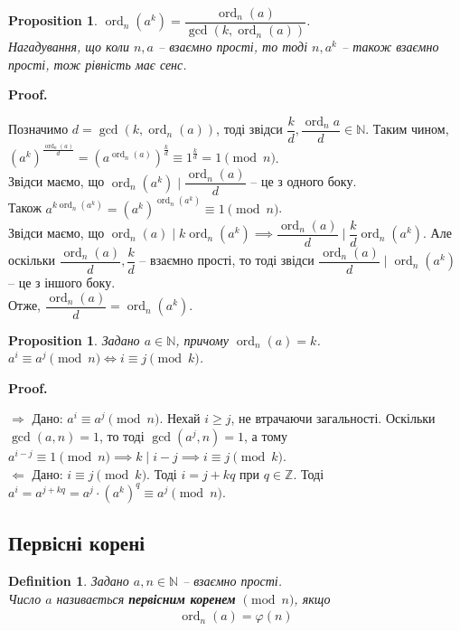 \documentclass[a4paper, 14pt]{extarticle}
\makeatletter
\theoremstyle{theoremdd}
\theoremstyle{theoremdd}
\newtheorem{definition}[theorem]{Definition}
\theoremstyle{theoremdd}
\theoremstyle{theoremdd}
\theoremstyle{theoremdd}
\newtheorem{proposition}[theorem]{Proposition}
\theoremstyle{theoremdd}
\theoremstyle{theoremdd}
\theoremstyle{theoremdd}
\def\qed{$\blacksquare$}
\def\rightproof{$\boxed{\Rightarrow}$ }
\def\leftproof{$\boxed{\Leftarrow}$ }
\renewenvironment{proof}[1][Proof.\\]{\par
\pushQED{\hfill \qed}%
\normalfont \topsep6\p@\@plus6\p@\relax
\trivlist
\item\relax
{\bfseries
#1\@addpunct{.}}\hspace\labelsep\ignorespaces
}{%
\popQED\endtrivlist\@endpefalse
}
\DeclareMathOperator{\ord}{ord}
\makeatother
\begin{document}
\begin{proposition}
$\ord_n (a^k) = \dfrac{\ord_n (a)}{\gcd(k,\ord_n (a))}$.\\
\textit{Нагадування, що коли $n,a$ -- взаємно прості, то тоді $n,a^k$ -- також взаємно прості, тож рівність має сенс.}
\end{proposition}

\begin{proof}
Позначимо $d = \gcd(k,\ord_n (a))$, тоді звідси $\dfrac{k}{d}, \dfrac{\ord_n a}{d} \in \mathbb{N}$. Таким чином,\\
$\left( a^k \right)^{\frac{\ord_n (a)}{d}} = \left( a^{\ord_n (a)} \right)^{\frac{k}{d}} \equiv 1^{\frac{k}{d}} = 1 \pmod n$.\\
Звідси маємо, що $\ord_n (a^k) \mid \dfrac{\ord_n (a)}{d}$ -- це з одного боку.\\
Також $a^{k \ord_n (a^k)} = (a^k)^{\ord_n (a^k)} \equiv 1 \pmod n$.\\
Звідси маємо, що $\ord_n (a) \mid k \ord_n (a^k) \implies \dfrac{\ord_n (a)}{d} \mid \dfrac{k}{d} \ord_n (a^k)$. Але оскільки $\dfrac{\ord_n (a)}{d}, \dfrac{k}{d}$ -- взаємно прості, то тоді звідси $\dfrac{\ord_n (a)}{d} \mid \ord_n (a^k)$ -- це з іншого боку.\\
Отже, $\dfrac{\ord_n (a)}{d} = \ord_n (a^k)$.
\end{proof}

\begin{proposition}
\label{power_congruence_equation}
Задано $a \in \mathbb{N}$, причому $\ord_n (a) = k$.\\
$a^i \equiv a^j \pmod n \iff i \equiv j \pmod k$.
\end{proposition}

\begin{proof}
\rightproof Дано: $a^i \equiv a^j \pmod n$. Нехай $i \geq j$, не втрачаючи загальності. Оскільки $\gcd(a,n) = 1$, то тоді $\gcd(a^j,n)=1$, а тому\\
$a^{i-j} \equiv 1 \pmod n \implies k \mid i-j \implies i \equiv j \pmod k$.
\bigskip \\
\leftproof Дано: $i \equiv j \pmod k$. Тоді $i = j + k q$ при $q \in \mathbb{Z}$. Тоді\\
$a^i = a^{j+kq} = a^j \cdot (a^k)^q \equiv a^j \pmod n$.
\end{proof}

\subsection{Первісні корені}
\begin{definition}
Задано $a, n \in \mathbb{N}$ -- взаємно прості.\\
Число $a$ називається \textbf{первісним коренем} $\!\! \pmod n$, якщо
\begin{align*}
\ord_n(a) = \varphi(n)
\end{align*}
\end{definition}
\end{document}
